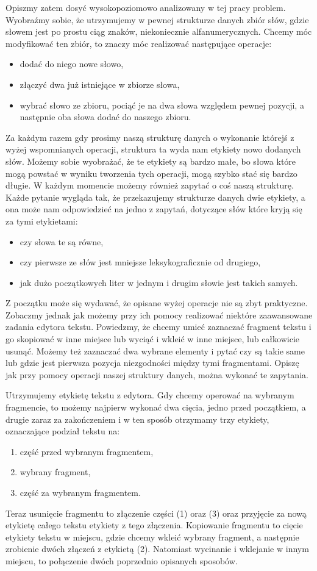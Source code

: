 \documentclass[declaration,shortabstract]{iithesis}
\theoremstyle{definition} \newtheorem{definition}{Definicja}[chapter]
\theoremstyle{remark} \newtheorem{remark}[definition]{Obserwacja}
\theoremstyle{plain} \newtheorem{theorem}[definition]{Twierdzenie}
\theoremstyle{remark} \newtheorem{example}{Przykład}[definition]
\theoremstyle{plain} \newtheorem{lemma}[definition]{Lemat}
\begin{document}
Opiszmy zatem dosyć wysokopoziomowo analizowany w tej pracy problem. Wyobraźmy sobie, że utrzymujemy w pewnej strukturze danych zbiór słów, gdzie słowem jest po prostu ciąg znaków, niekoniecznie alfanumerycznych. Chcemy móc modyfikować ten zbiór, to znaczy móc realizować następujące operacje: 
\begin{itemize}
    \item dodać do niego nowe słowo, 
    \item złączyć dwa już istniejące w zbiorze słowa,
    \item wybrać słowo ze zbioru, pociąć je na dwa słowa względem pewnej pozycji, a następnie oba słowa dodać do naszego zbioru. 
\end{itemize}
Za każdym razem gdy prosimy naszą strukturę danych o wykonanie którejś z wyżej wspomnianych operacji, struktura ta wyda nam etykiety nowo dodanych słów. Możemy sobie wyobrażać, że te etykiety są bardzo małe, bo słowa które mogą powstać w wyniku tworzenia tych operacji, mogą szybko stać się bardzo długie. W każdym momencie możemy również zapytać o coś naszą strukturę. Każde pytanie wygląda tak, że przekazujemy strukturze danych dwie etykiety, a ona może nam odpowiedzieć na jedno z zapytań, dotyczące słów które kryją się za tymi etykietami:
\begin{itemize}
    \item czy słowa te są równe,
    \item czy pierwsze ze słów jest mniejsze leksykograficznie od drugiego,
    \item jak dużo początkowych liter w jednym i drugim słowie jest takich samych.
\end{itemize}

Z początku może się wydawać, że opisane wyżej operacje nie są zbyt praktyczne. Zobaczmy jednak jak możemy przy ich pomocy realizować niektóre zaawansowane zadania edytora tekstu. Powiedzmy, że chcemy umieć zaznaczać fragment tekstu i go skopiować w inne miejsce lub wyciąć i wkleić w inne miejsce, lub całkowicie usunąć. Możemy też zaznaczać dwa wybrane elementy i pytać czy są takie same lub gdzie jest pierwsza pozycja niezgodności między tymi fragmentami. Opiszę jak przy pomocy operacji naszej struktury danych, można wykonać te zapytania.

Utrzymujemy etykietę tekstu z edytora. Gdy chcemy operować na wybranym fragmencie, to możemy najpierw wykonać dwa cięcia, jedno przed początkiem, a drugie zaraz za zakończeniem i w ten sposób otrzymamy trzy etykiety, oznaczające podział tekstu na:
\begin{enumerate}
    \item część przed wybranym fragmentem,
    \item wybrany fragment,
    \item część za wybranym fragmentem.
\end{enumerate}
Teraz usunięcie fragmentu to złączenie części (1) oraz (3) oraz przyjęcie za nową etykietę całego tekstu etykiety z tego złączenia. Kopiowanie fragmentu to cięcie etykiety tekstu w miejscu, gdzie chcemy wkleić wybrany fragment, a następnie zrobienie dwóch złączeń z etykietą (2). Natomiast wycinanie i wklejanie w innym miejscu, to połączenie dwóch poprzednio opisanych sposobów.
\end{document}
